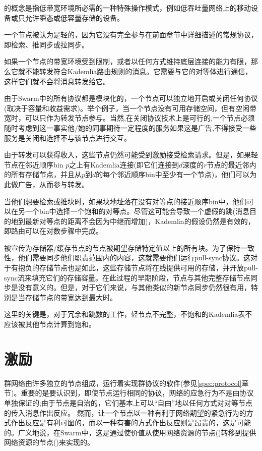 的概念是指低带宽环境所必需的一种特殊操作模式，例如低吞吐量网络上的移动设备或只允许瞬态或低容量存储的设备。

一个节点被认为是轻的，因为它没有完全参与在前面章节中详细描述的常规协议，即检索、推同步或拉同步。

如果一个节点的带宽环境受到限制，或者以任何方式维持底层连接的能力有限，那么它就不能转发符合Kademlia路由规则的消息。它需要与它的对等体进行通信，这样它们就不会将消息转发给它。

由于Swarm中的所有协议都是模块化的，一个节点可以独立地开启或关闭任何协议(取决于容量和收益需求)。举个例子，当一个节点没有可用存储空间，但有空闲带宽时，可以只作为转发节点参与。当然,在关闭协议技术上是可行的,一个节点必须随时考虑到这一事实他/她的同事期待一定程度的服务如果这是广告,不得接受一些服务是关闭和选择不与该节点进行交互。

由于转发可以获得收入，这些节点仍然可能受到激励接受检索请求。但是，如果轻节点在邻近顺序bin $p$之上有Kademlia连接(即它们连接到$d$深度的$r$节点的最近邻内的所有存储节点，并且从$p$到$d$的每个邻近顺序bin中至少有一个节点)，他们可以为此做广告，从而参与转发。

当他们想要检索或推块时，如果块地址落在没有对等点的接近顺序bin中，他们可以在另一个bin中选择一个饱和的对等点。尽管这可能会导致一个虚假的跳(消息目的地到最新对等点的距离不会因为中继而增加)，Kademlia的假设仍然是有效的，即路由可以在对数步骤中完成。

被宣传为存储器/缓存节点的节点被期望存储特定值以上的所有块。为了保持一致性，他们需要同步他们职责范围内的内容，这就需要他们运行pull-sync协议。这对于有抱负的存储节点也是如此，这些存储节点将在线提供可用的存储，并开放pull-sync流来填充它们的存储容量。在此过程的早期阶段，节点与其他完整存储节点同步是没有意义的。但是，对于它们来说，与其他类似的新节点同步仍然很有用，特别是当存储节点的带宽达到最大时。

这里的关键是，对于冗余和跳数的工作，轻节点不完整，不饱和的Kademlia表不应该被其他节点计算到饱和。


\chapter{激励}\label{sec:incentivisation}
群网络由许多独立的节点组成，运行着实现群协议的软件(参见\ref{spec:protocol}章节)。重要的是要认识到，即使节点运行相同的协议，网络的应急行为不是由协议单独保证的;由于节点是自治的，它们基本上可以“自由”地以任何方式对对等节点的传入消息作出反应。
然而，让一个节点以一种有利于网络期望的紧急行为的方式作出反应是有利可图的，而以一种有害的方式作出反应则是昂贵的，这是可能的。广义地说，在Swarm中，这是通过使价值从使用网络资源的节点()转移到提供网络资源的节点()来实现的。 


